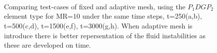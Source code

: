 \documentclass[preprint,authoryear,12pt]{elsarticle}
\begin{document}
\begin{figure}[h]
\begin{center}
{}%
\\ 
\\
\\
\end{center}
\caption{Comparing test-cases of fixed and adaptive mesh, using the $P_{1}DGP_{2}$ element type for MR=$10$ under the same time steps, t=250(a,b), t=500(c,d), t=1500(e,f), t=3000(g,h). When adaptive mesh is introduce there is better repersentation of the fluid instabilities as these are developed on time. }
\label{fig:2testcase}
\end{figure}
\end{document}
